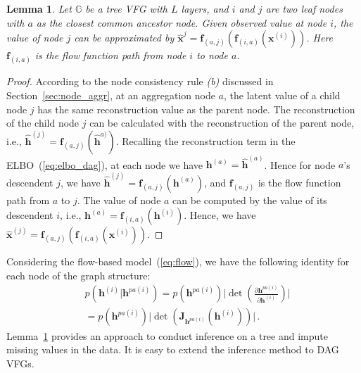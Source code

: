 \documentclass[sigconf, anonymous, review]{acmart}
\theoremstyle{plain}
\newtheorem{lemma}[theorem]{Lemma}
\theoremstyle{definition}
\theoremstyle{remark}
\begin{document}
\begin{lemma}\label{lm:apprx}
Let $\mathbb{G}$ be a  tree VFG  with $L$ layers, and $i$ and $j$ are two leaf nodes with $a$ as the closest common ancestor node. Given observed value at node $i$, the value of node $j$ can be approximated by   $\widehat{\mathbf{x}}^{j} =  \mathbf{f}_{(a,j)}(\mathbf{f}_{(i, a)}(\mathbf{x}^{(i)}))$. Here $\mathbf{f}_{(i, a)}$ is the flow function path from node $i$ to node $a$. 
\end{lemma}
\begin{proof}
According to the node consistency rule {\it(b)}  discussed in Section~\ref{sec:node_aggr}, at an aggregation node  $a$, the latent value of a child node $j$ has the same reconstruction value as the parent node.  
The reconstruction of the child node $j$ can be calculated with the reconstruction of the parent node, i.e., $\widehat{\mathbf{h}}^{(j)} = \mathbf{f}_{(a,j)}(\widehat{\mathbf{h}}^{a)})$. 
Recalling the reconstruction term in the ELBO~(\ref{eq:elbo_dag}), at each node we have $\mathbf{h}^{(a)} = \widehat{\mathbf{h}}^{(a)}$. Hence for node $a$'s descendent $j$, we have $\widehat{\mathbf{h}}^{(j)} = \mathbf{f}_{(a,j)}(\mathbf{h}^{(a)})$, and $\mathbf{f}_{(a,j)}$ is the flow function path from $a$ to $j$. 
The value of node $a$ can be computed by the value of its descendent $i$, i.e., $\mathbf{h}^{(a)} = \mathbf{f}_{(i,a)}(\mathbf{h}^{(i)})$. Hence, we have $\widehat{\mathbf{x}}^{(j)} =  \mathbf{f}_{(a,j)}(\mathbf{f}_{(i, a)}(\mathbf{x}^{(i)}))$.
\end{proof}

Considering the flow-based model~(\ref{eq:flow}), we have the following identity for each node of the graph structure:
\begin{align*}
& p(\mathbf{h}^{(i)} | \mathbf{h}^{pa(i)})  = p(\mathbf{h}^{pa(i)}) \big|\det(\frac{\partial \mathbf{h}^{pa(i)} }{\partial \mathbf{h}^{(i)}})\big| \\
& =
p(\mathbf{h}^{pa(i)}) \big|\det(\mathbf{J}_{\mathbf{h}^{pa(i)}}(\mathbf{h}^{(i)}))\big| \, .
\end{align*}
Lemma~\ref{lm:apprx} provides an approach to conduct inference on a tree and impute missing values in the data. It is easy to extend the inference method to DAG VFGs. 



\end{document}
